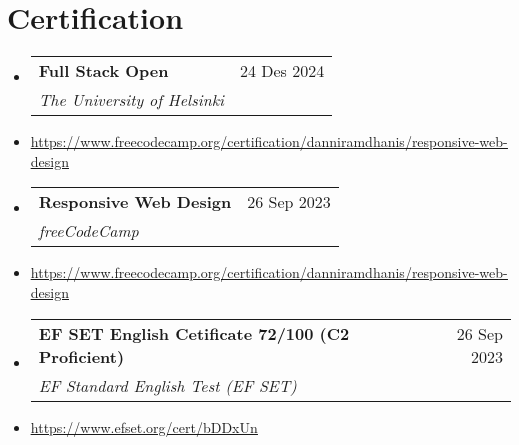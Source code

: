 \documentclass[letterpaper,11pt]{article}
\makeatletter
\newcommand{\resumeItem}[1]{
  \item\small{
    {#1 \vspace{-2pt}}
  }
}
\newcommand{\resumeSubheading}[4]{
  \vspace{-2pt}\item
    \begin{tabular*}{0.97\textwidth}[t]{l@{\extracolsep{\fill}}r}
      \textbf{#1} & #2 \\
      \textit{\small#3} & \textit{\small #4} \\
    \end{tabular*}\vspace{-7pt}
}
\newcommand{\resumeSubHeadingListStart}{\begin{itemize}[leftmargin=0.15in, label={}]}
\newcommand{\resumeSubHeadingListEnd}{\end{itemize}}
\makeatother
\begin{document}
\section{Certification}
\resumeSubHeadingListStart
\resumeSubheading
{Full Stack Open}{\small 24 Des 2024}
{The University of Helsinki}{}
\resumeItem{\footnotesize \href{https://www.freecodecamp.org/certification/danniramdhanis/responsive-web-design}{\small\ul {https://www.freecodecamp.org/certification/danniramdhanis/responsive-web-design}}} \\ [0.8em]
\resumeSubheading
{Responsive Web Design}{\small 26 Sep 2023}
{freeCodeCamp}{}
\resumeItem{\footnotesize \href{https://www.freecodecamp.org/certification/danniramdhanis/responsive-web-design}{\small\ul {https://www.freecodecamp.org/certification/danniramdhanis/responsive-web-design}}} \\ [0.8em]
\resumeSubheading
{EF SET English Cetificate 72/100 (C2 Proficient)}{\small 26 Sep 2023}
{EF Standard English Test (EF SET)}{}
\resumeItem{\footnotesize \href{https://www.efset.org/cert/bDDxUn}{\small\ul {https://www.efset.org/cert/bDDxUn}}}
\resumeSubHeadingListEnd


\end{document}
